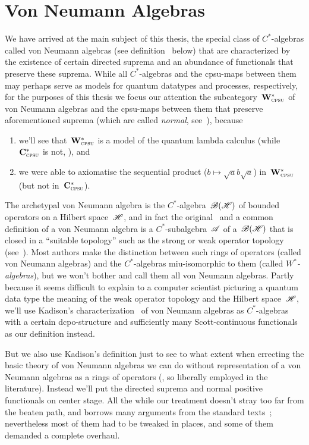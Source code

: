 \documentclass[a]{subfiles}
\begin{document}
\chapter{Von Neumann Algebras}
\begin{parsec}%
We have arrived at the main subject of this thesis,
the special class of $C^*$-algebras
called von Neumann algebras (see definition~ below)
that are characterized by the existence
of certain directed suprema 
and an abundance  of functionals that preserve
these suprema.
While all $C^*$-algebras
and the cpsu-maps
between them
may perhaps serve as models for
quantum datatypes and processes, respectively,
for the purposes of this thesis
we focus our attention
the subcategory~$\mathbf{W}^*_{\text{\textsc{cpsu}}}$ of von Neumann algebras
and the cpsu-maps between them that preserve aforementioned suprema
(which are called \emph{normal}, see~),
because 
\begin{enumerate}
\item
we'll see that~$\mathbf{W}^*_{\text{\textsc{cpsu}}}$
is a model of the quantum lambda calculus
(while~$\mathbf{C}^*_{\text{\textsc{cpsu}}}$ is not, ), and
\item
we were able to axiomatise
the sequential product ($b\mapsto \sqrt{a}b\sqrt{a}$)
in~$\mathbf{W}^*_{\text{\textsc{cpsu}}}$ (but not in~$\mathbf{C}^*_{\text{\textsc{cpsu}}}$).
\end{enumerate}

The archetypal von Neumann algebra
is the $C^*$-algebra~$\mathscr{B}(\mathscr{H})$
of bounded operators on a Hilbert space~$\mathscr{H}$,
and in fact 
the
original~\cite{vn1930,mvn1936}
and a common~\cite{kr,conway2000} 
definition of a von Neumann algebra
is a $C^*$-subalgebra~$\mathscr{A}$
of a~$\mathscr{B}(\mathscr{H})$
that is closed in a ``suitable topology''
such as the strong or weak operator topology
(see~).
Most authors make the distinction
between such rings of operators
(called von Neumann algebras)
and the $C^*$-algebras
miu-isomorphic to them
(called \emph{$W^*$-algebras}),
but we won't bother and call them all von Neumann algebras.
Partly because it seems difficult
to explain 
to a computer scientist
picturing a quantum data type
the meaning of the weak operator topology
and the Hilbert space~$\mathscr{H}$,
we'll use Kadison's characterization~\cite{kadison1956}
of von Neumann algebras
as $C^*$-algebras
with a certain dcpo-structure 
and sufficiently many Scott-continuous functionals
as our definition instead.

But we also use Kadison's definition
just to see to what extent
when errecting the basic theory of von Neumann algebras
we can do without representation
of a von Neumann algebras as a rings of operators
(, so liberally employed in the literature).
Instead we'll put the directed suprema and normal 
positive functionals
on center stage.
All the while
our treatment doesn't stray too far
from the beaten path,
and borrows
many arguments
from
the standard texts~\cite{sakai,kr};
nevertheless most of them had to be tweaked in places, and
some of them demanded a complete overhaul.



\end{parsec}
\end{document}
